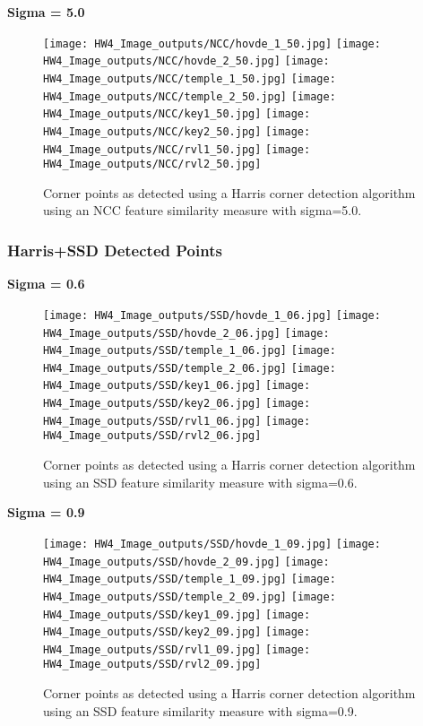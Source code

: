 \documentclass{article}
\begin{document}
\newpage
\textbf{Sigma = 5.0}
\begin{figure}[H]
    \centering
    \texttt{[image: HW4\_Image\_outputs/NCC/hovde\_1\_50.jpg]}
    \texttt{[image: HW4\_Image\_outputs/NCC/hovde\_2\_50.jpg]}
    \texttt{[image: HW4\_Image\_outputs/NCC/temple\_1\_50.jpg]}
    \texttt{[image: HW4\_Image\_outputs/NCC/temple\_2\_50.jpg]}
    \texttt{[image: HW4\_Image\_outputs/NCC/key1\_50.jpg]}
    \texttt{[image: HW4\_Image\_outputs/NCC/key2\_50.jpg]}
    \texttt{[image: HW4\_Image\_outputs/NCC/rvl1\_50.jpg]}
    \texttt{[image: HW4\_Image\_outputs/NCC/rvl2\_50.jpg]}
    \caption{Corner points as detected using a Harris corner detection algorithm using an NCC feature similarity measure with sigma=5.0.}
    \label{fig:ncc-points-5.0}
\end{figure}

\subsubsection{Harris+SSD Detected Points}
\newpage
\textbf{Sigma = 0.6}
\begin{figure}[H]
    \centering
    \texttt{[image: HW4\_Image\_outputs/SSD/hovde\_1\_06.jpg]}
    \texttt{[image: HW4\_Image\_outputs/SSD/hovde\_2\_06.jpg]}
    \texttt{[image: HW4\_Image\_outputs/SSD/temple\_1\_06.jpg]}
    \texttt{[image: HW4\_Image\_outputs/SSD/temple\_2\_06.jpg]}
    \texttt{[image: HW4\_Image\_outputs/SSD/key1\_06.jpg]}
    \texttt{[image: HW4\_Image\_outputs/SSD/key2\_06.jpg]}
    \texttt{[image: HW4\_Image\_outputs/SSD/rvl1\_06.jpg]}
    \texttt{[image: HW4\_Image\_outputs/SSD/rvl2\_06.jpg]}
    \caption{Corner points as detected using a Harris corner detection algorithm using an SSD feature similarity measure with sigma=0.6.}
    \label{fig:ncc-points-0.6}    
\end{figure}

\newpage
\textbf{Sigma = 0.9}
\begin{figure}[H]
    \centering
    \texttt{[image: HW4\_Image\_outputs/SSD/hovde\_1\_09.jpg]}
    \texttt{[image: HW4\_Image\_outputs/SSD/hovde\_2\_09.jpg]}
    \texttt{[image: HW4\_Image\_outputs/SSD/temple\_1\_09.jpg]}
    \texttt{[image: HW4\_Image\_outputs/SSD/temple\_2\_09.jpg]}
    \texttt{[image: HW4\_Image\_outputs/SSD/key1\_09.jpg]}
    \texttt{[image: HW4\_Image\_outputs/SSD/key2\_09.jpg]}
    \texttt{[image: HW4\_Image\_outputs/SSD/rvl1\_09.jpg]}
    \texttt{[image: HW4\_Image\_outputs/SSD/rvl2\_09.jpg]}
    \caption{Corner points as detected using a Harris corner detection algorithm using an SSD feature similarity measure with sigma=0.9.}
    \label{fig:ncc-points-0.6}
\end{figure}
\end{document}
